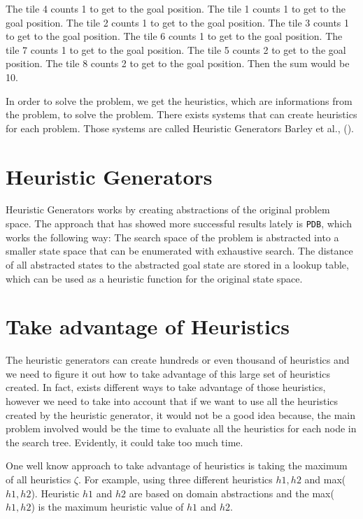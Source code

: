 The tile 4 counts 1 to get to the goal position.
The tile 1 counts 1 to get to the goal position.
The tile 2 counts 1 to get to the goal position.
The tile 3 counts 1 to get to the goal position.
The tile 6 counts 1 to get to the goal position.
The tile 7 counts 1 to get to the goal position.
The tile 5 counts 2 to get to the goal position.
The tile 8 counts 2 to get to the goal position.
Then the sum would be 10.

In order to solve the problem, we get the heuristics, which are informations from the problem, to solve the problem. There exists systems that can create heuristics for each problem. Those systems are called Heuristic Generators Barley et al., (\citeyear{BarleySantiagoOver}).

\section{Heuristic Generators}
Heuristic Generators works by creating abstractions of the original problem space. The approach that has showed more successful results lately is \texttt{PDB}, which works the following way: The search space of the problem is abstracted into a smaller state space that can be enumerated with exhaustive search. The distance of all abstracted states to the abstracted goal state are stored in a lookup table, which can be used as a heuristic function for the original state space.

\section{Take advantage of Heuristics}
The heuristic generators can create hundreds or even thousand of heuristics and we need to figure it out how to take advantage of this large set of heuristics created. In fact, exists different ways to take advantage of those heuristics, however we need to take into account that if we want to use all the heuristics created by the heuristic generator, it would not be a good idea because, the main problem involved would be the time to evaluate all the heuristics for each node in the search tree. Evidently, it could take too much time.

One well know approach to take advantage of heuristics is taking the maximum of all heuristics $\zeta$. For example, using three different heuristics $h1, h2$ and max($h1, h2$). Heuristic $h1$ and $h2$ are based on domain abstractions and the max($h1, h2$) is the maximum heuristic value of $h1$ and $h2$.

